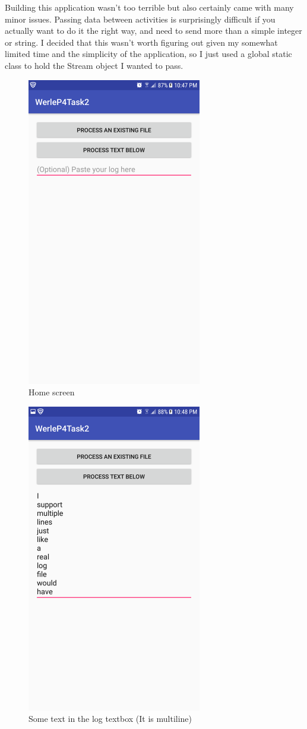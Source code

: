 \documentclass[11pt]{article}
\begin{document}
	Building this application wasn't too terrible but also certainly came with many minor issues. Passing data between activities is surprisingly difficult if you actually want to do it the right way, and need to send more than a simple integer or string. I decided that this wasn't worth figuring out given my somewhat limited time and the simplicity of the application, so I just used a global static class to hold the Stream object I wanted to pass.
	
	\begin{figure}[ht]
		\includegraphics[width=3in]{img/t2s1.png}
		\centering
		\caption{Home screen}
	\end{figure}
	\begin{figure}[ht]
		\includegraphics[width=3in]{img/t2s2.png}
		\centering
		\caption{Some text in the log textbox (It is multiline)}
	\end{figure}
\end{document}
